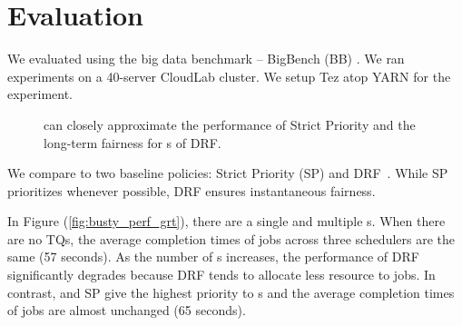 \section{Evaluation}

We evaluated \name using the big data benchmark -- BigBench (BB) \cite{bbench}. We ran experiments on a 40-server CloudLab cluster. We setup Tez atop YARN for the experiment.
\begin{figure}[!h]
	\centering
	\vspace{-0.15in}	
	\caption{\name can closely approximate the \burstq performance of Strict Priority and the long-term fairness for {\batchq}s of DRF.}
\end{figure}

We compare {\name} to two baseline policies: Strict Priority (SP) \cite{strict_priority} and DRF~\cite{drf}. While SP prioritizes \burstq whenever possible, DRF ensures instantaneous fairness. 


In Figure (\ref{fig:busty_perf_grt}), there are a single \burstq and multiple {\batchq}s.
When there are no TQs, the average completion times of \burstq jobs across three schedulers are the same (57 seconds).
As the number of {\batchq}s increases, the performance of DRF significantly degrades because DRF tends to allocate less resource to {\burstq} jobs. 
In contrast, \name and SP give the highest priority to {\burstq}s and the average completion times of \burstq jobs are almost unchanged (65 seconds).

